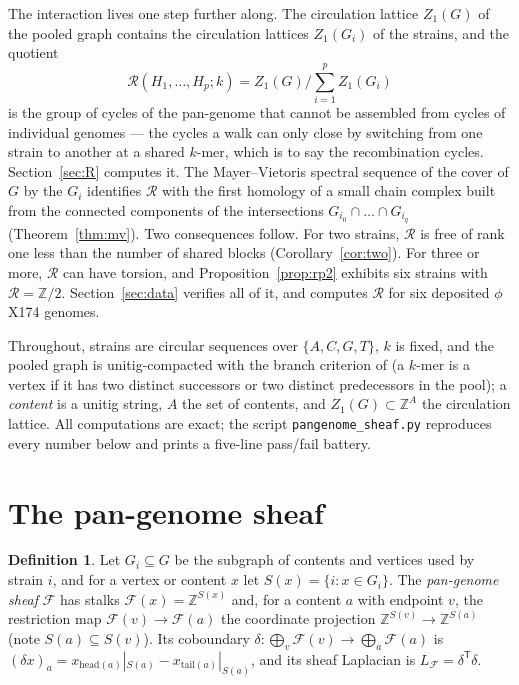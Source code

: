 \documentclass[11pt]{article}
\theoremstyle{plain}
\theoremstyle{definition}
\newtheorem{definition}[theorem]{Definition}
\theoremstyle{remark}
\newcommand{\Z}{\mathbb{Z}}
\newcommand{\Rec}{\mathcal{R}}
\newcommand{\sheaf}{\mathcal{F}}
\begin{document}
The interaction lives one step further along. The circulation lattice $Z_1(G)$ of the pooled
graph contains the circulation lattices $Z_1(G_i)$ of the strains, and the quotient
\[
  \Rec(H_1,\dots,H_p;k)=Z_1(G)\Big/\sum_{i=1}^pZ_1(G_i)
\]
is the group of cycles of the pan-genome that cannot be assembled from cycles of individual
genomes --- the cycles a walk can only close by switching from one strain to another at a
shared $k$-mer, which is to say the recombination cycles. Section~\ref{sec:R} computes it.
The Mayer--Vietoris spectral sequence of the cover of $G$ by the $G_i$ identifies $\Rec$ with
the first homology of a small chain complex built from the connected components of the
intersections $G_{i_0}\cap\dots\cap G_{i_q}$ (Theorem~\ref{thm:mv}). Two consequences
follow. For two strains, $\Rec$ is free of rank one less than the number of shared blocks
(Corollary~\ref{cor:two}). For three or more, $\Rec$ can have torsion, and
Proposition~\ref{prop:rp2} exhibits six strains with $\Rec=\Z/2$. Section~\ref{sec:data}
verifies all of it, and computes $\Rec$ for six deposited $\phi$X174 genomes.

Throughout, strains are circular sequences over $\{A,C,G,T\}$, $k$ is fixed, and the pooled
graph is unitig-compacted with the branch criterion of \cite{Bio9} (a $k$-mer is a vertex if
it has two distinct successors or two distinct predecessors in the pool); a \emph{content}
is a unitig string, $A$ the set of contents, and $Z_1(G)\subset\Z^A$ the circulation lattice.
All computations are exact; the script \texttt{pangenome\_sheaf.py} reproduces every number
below and prints a five-line pass/fail battery.

\section{The pan-genome sheaf}\label{sec:sheaf}

\begin{definition}\label{def:sheaf}
Let $G_i\subseteq G$ be the subgraph of contents and vertices used by strain $i$, and for a
vertex or content $x$ let $S(x)=\{i:x\in G_i\}$. The \emph{pan-genome sheaf} $\sheaf$ has
stalks $\sheaf(x)=\Z^{S(x)}$ and, for a content $a$ with endpoint $v$, the restriction map
$\sheaf(v)\to\sheaf(a)$ the coordinate projection $\Z^{S(v)}\to\Z^{S(a)}$ (note
$S(a)\subseteq S(v)$). Its coboundary $\delta\colon\bigoplus_v\sheaf(v)\to\bigoplus_a\sheaf(a)$
is $(\delta x)_a=x_{\mathrm{head}(a)}|_{S(a)}-x_{\mathrm{tail}(a)}|_{S(a)}$, and its sheaf
Laplacian is $L_\sheaf=\delta^{\mathsf T}\delta$.
\end{definition}
\end{document}
